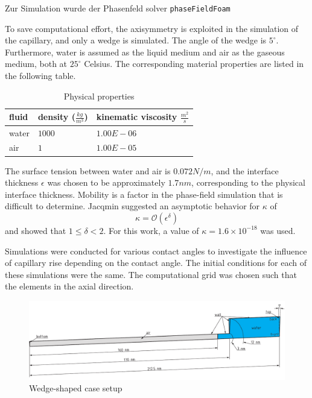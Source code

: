 
Zur Simulation wurde der Phasenfeld solver \texttt{phaseFieldFoam} 






To save computational effort, the axisymmetry is exploited in the simulation of the capillary, and only a wedge is simulated. The angle of the wedge is \(5^\circ\). Furthermore, water is assumed as the liquid medium and air as the gaseous medium, both at \(25^\circ\) Celsius. The corresponding material properties are listed in the following table.

\begin{table}[h]
\centering
\caption{Physical properties}
\label{tab:physicalProperties_CaseSetup}
\begin{tabular}{lll}
fluid & density ($\frac{kg}{m^3}$) & kinematic viscosity $\frac{m^2}{s}$ \\ \hline
water & $1000$                     & $1.00E-06$                          \\
air   & $1$                        & $1.00E-05$                          \\ 
\end{tabular}
\end{table}

The surface tension between water and air is \(0.072 N/m\), and the interface thickness \( \epsilon \) was chosen to be approximately \(1.7 nm\), corresponding to the physical interface thickness. Mobility is a factor in the phase-field simulation that is difficult to determine. Jacqmin \cite{jacqmin1999CalculationTwoPhaseNavier} suggested an asymptotic behavior for \( \kappa \) of 
\begin{equation}
    \kappa = \mathcal{O}(\epsilon^{\delta})
\end{equation}
and showed that \( 1 \leq \delta < 2 \). 
For this work, a value of \( \kappa = 1.6 \times 10^{-18} \) was used. 

Simulations were conducted for various contact angles to investigate the influence of capillary rise depending on the contact angle. The initial conditions for each of these simulations were the same. The computational grid was chosen such that the elements in the axial direction. 

\begin{figure}[h]
    \centering
    \includegraphics[width=.9\textwidth]{Pictures/Cap_5DEG.pdf}
    \caption{Wedge-shaped case setup}
    \label{fig: wedge_caseSetup}
\end{figure}

